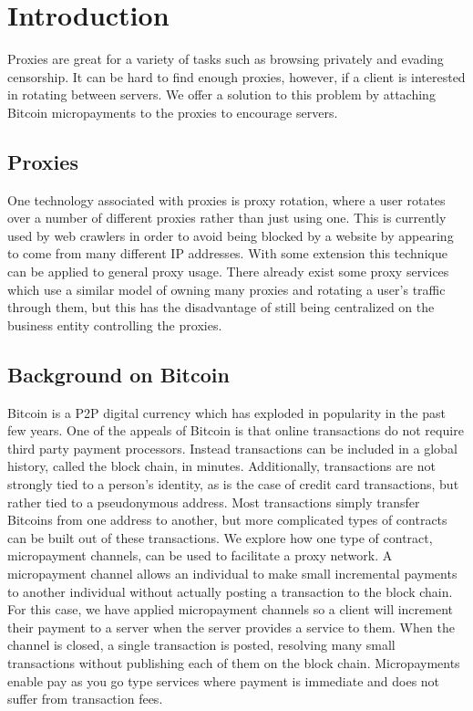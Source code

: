 \section{Introduction}
\label{sec:intro}

Proxies are great for a variety of tasks such as browsing privately and evading censorship. It can be hard to find enough proxies, however, if a client is interested in rotating between servers. We offer a solution to this problem by attaching Bitcoin micropayments to the proxies to encourage servers. 

\subsection{Proxies}

One technology associated with proxies is proxy rotation, where a user rotates over a number of different proxies rather than just using one. This is currently used by web crawlers in order to avoid being blocked by a website by appearing to come from many different IP addresses. With some extension this technique can be applied to general proxy usage. There already exist some proxy services which use a similar model of owning many proxies and rotating a user's traffic through them, but this has the disadvantage of still being centralized on the business entity controlling the proxies. 

\subsection{Background on Bitcoin}

Bitcoin\cite{nakamoto2008bitcoin} is a P2P digital currency which has exploded in popularity in the past few years. One of the appeals of Bitcoin is that online transactions do not require third party payment processors. Instead transactions can be included in a global history, called the block chain, in minutes. Additionally, transactions are not strongly tied to a person's identity, as is the case of credit card transactions, but rather tied to a pseudonymous address. Most transactions simply transfer Bitcoins from one address to another, but more complicated types of contracts can be built out of these transactions. We explore how one type of contract, micropayment channels, can be used to facilitate a proxy network. A micropayment channel allows an individual to make small incremental payments to another individual without actually posting a transaction to the block chain. For this case, we have applied micropayment channels so a client will increment their payment to a server when the server provides a service to them. When the channel is closed, a single transaction is posted, resolving many small transactions without publishing each of them on the block chain. Micropayments enable pay as you go type services where payment is immediate and does not suffer from transaction fees.

